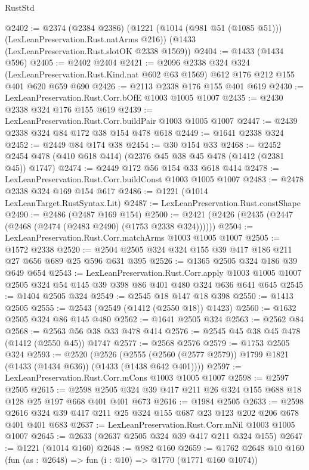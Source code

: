\begin{lexlean}{RustStd}
\begin{coremodule}
@2402 := @2374
    (@2384 @2386)
    (@1221 (@1014 (@981 @51 (@1085 @51))) (LexLeanPreservation.Rust.natArms @216))
    (@1433 (LexLeanPreservation.Rust.slotOK @2338 @1569))
@2404 := @1433 (@1434 @596)
@2405 := @2402 @2404
@2421 := @2096
    @2338
    @324
    @324
    (LexLeanPreservation.Rust.Kind.nat @602 @63 @1569)
    @612
    @176
    @212
    @155
    @401
    @620
    @659
    @690
@2426 := @2113 @2338 @176 @155 @401 @619
@2430 := LexLeanPreservation.Rust.Corr.bOfE @1003 @1005 @1007
@2435 := @2430 @2338 @324 @176 @155 @619
@2439 := LexLeanPreservation.Rust.Corr.buildPair @1003 @1005 @1007
@2447 := @2439 @2338 @324 @84 @172 @38 @154 @478 @618
@2449 := @1641 @2338 @324
@2452 := @2449 @84 @174 @38
@2454 := @30 @154 @33
@2468 := @2452 @2454 @478 (@410 @618 @414) (@2376 @45 @38 @45 @478 (@1412 (@2381 @45)) @1747)
@2474 := @2449 @172 @56 @154 @33 @618 @414
@2478 := LexLeanPreservation.Rust.Corr.buildConst @1003 @1005 @1007
@2483 := @2478 @2338 @324 @169 @154 @617
@2486 := @1221 (@1014 LexLeanTarget.RustSyntax.Lit)
@2487 := LexLeanPreservation.Rust.constShape
@2490 := @2486 (@2487 @169 @154)
@2500 := @2421 (@2426 (@2435 (@2447 (@2468 (@2474 (@2483 @2490) (@1753 @2338 @324))))))
@2504 := LexLeanPreservation.Rust.Corr.matchArms @1003 @1005 @1007
@2505 := @1572 @2338
@2520 := @2504 @2505 @324 @324 @155 @39 @417 @186 @211 @27 @656 @689 @25 @596 @631 @395
@2526 := @1365 @2505 @324 @186 @39 @649 @654
@2543 := LexLeanPreservation.Rust.Corr.apply
    @1003
    @1005
    @1007
    @2505
    @324
    @54
    @145
    @39
    @398
    @86
    @401
    @480
    @324
    @636
    @641
    @645
@2545 := @1404 @2505 @324
@2549 := @2545 @18 @147 @18 @398
@2550 := @1413 @2505
@2555 := @2543 (@2549 (@1412 (@2550 @18)) @1423)
@2560 := @1632 @2505 @324 @86 @145 @480
@2562 := @1641 @2505 @324
@2563 := @2562 @84
@2568 := @2563 @56 @38 @33 @478 @414
@2576 := @2545 @45 @38 @45 @478 (@1412 (@2550 @45)) @1747
@2577 := @2568 @2576
@2579 := @1753 @2505 @324
@2593 := @2520
    (@2526 (@2555 (@2560 (@2577 @2579)) @1799 @1821 (@1433 (@1434 @636)) (@1433 (@1438 @642 @401))))
@2597 := LexLeanPreservation.Rust.Corr.mCons @1003 @1005 @1007
@2598 := @2597 @2505
@2615 := @2598 @2505 @324 @39 @417 @211 @26 @324 @155 @688 @18 @128 @25 @197 @668 @401 @401 @673
@2616 := @1984 @2505
@2633 := @2598 @2616 @324 @39 @417 @211 @25 @324 @155 @687 @23 @123 @202 @206 @678 @401 @401 @683
@2637 := LexLeanPreservation.Rust.Corr.mNil @1003 @1005 @1007
@2645 := @2633 (@2637 @2505 @324 @39 @417 @211 @324 @155)
@2647 := @1221 (@1014 @160)
@2648 := @982 @160
@2659 := @1762
    @2648
    @10
    @160
    (fun (as : @2648) => fun (i : @10) => @1770 (@1771 @160 @1074))

\end{coremodule}
\end{lexlean}
